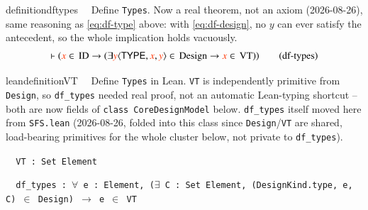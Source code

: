 \begin{restatable}{definition}{dftypes}~~ Define \texttt{Types}. Now a real
theorem, not an axiom (2026-08-26), same reasoning as \ref{eq:df-type} above: with
\ref{eq:df-design}, no $y$ can ever satisfy the antecedent, so the whole implication holds
vacuously.
\begin{align}
\vdash ( \msc{x} \in \,\mathrm{ID} \rightarrow ( \exists \msc{y} \langle \mathsf{TYPE} , \msc{x} ,
    \msc{y} \rangle \in \,\mathrm{Design} \rightarrow \msc{x} \in \,\mathrm{VT}
    ) )\label{eq:df-types}\tag{df-types}
\end{align}
\end{restatable}

\begin{restatable}{leandefinition}{VT}~~ Define \texttt{Types} in Lean. \texttt{VT} is
independently primitive from \texttt{Design}, so \texttt{df\_types} needed real proof, not an automatic
Lean-typing shortcut -- both are now fields of \texttt{class CoreDesignModel} below.
\texttt{df\_types} itself moved here from \texttt{SFS.lean} (2026-08-26, folded into this class since
\texttt{Design}/\texttt{VT} are shared, load-bearing primitives for the whole cluster below, not private
to \texttt{df\_types}).

\texttt{~~VT : Set Element}

\texttt{~~df\_types : $\forall$ e : Element, ($\exists$ C : Set Element, (DesignKind.type, e, C) $\in$ Design) $\to$ e $\in$ VT}
\label{VT}
\end{restatable}

